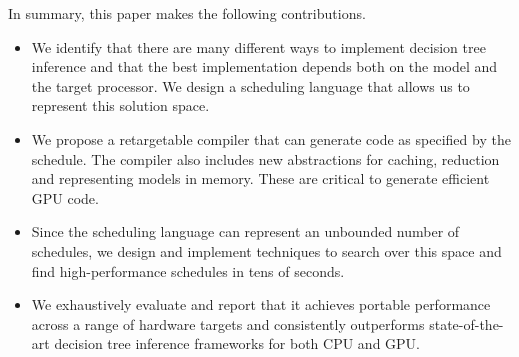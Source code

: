 In summary, this paper makes the following contributions.
\begin{itemize}
  \item We identify that there are many different ways to implement  
  decision tree inference and that the best implementation depends both on the model
  and the target processor. We design a scheduling language that 
  allows us to represent this solution space. 
  \item We propose a retargetable compiler that can generate code as specified by 
  the schedule. The compiler also includes new abstractions for caching,
  reduction and representing models in memory. These are critical to generate 
  efficient GPU code.
  \item Since the scheduling language can represent an unbounded number of schedules, 
  we design and implement techniques to search over this space and find high-performance 
  schedules in tens of seconds. 
  \item We exhaustively evaluate \Treebeard{} and report that it achieves 
  portable performance across a range of hardware targets and consistently outperforms
  state-of-the-art decision tree inference frameworks for both CPU and GPU.
\end{itemize}
